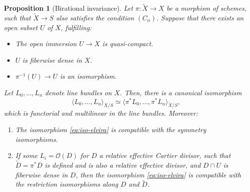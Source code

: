 \documentclass[JEP,XML,SOM,Unicode,published]{cedram}
\theoremstyle{plain}
\newtheorem{proposition}[theorem]{Proposition}
\theoremstyle{definition}
\newcommand{\Ocal}{\mathcal O}
\begin{document}
\begin{proposition}[Birational invariance]\label{prop:elvira}
Let $\pi \colon \widetilde{X} \to X$ be a morphism of schemes, such that $\widetilde{X} \to S$ also satisfies the condition $(C_n)$. Suppose that there exists an open subset $U$ of $X$, fulfilling:
\begin{itemize}
\item The open immersion $U \to X$ is quasi-compact.
\item $U$ is fiberwise dense in $X$.
\item $\pi^{-1}(U)\to U$ is an isomorphism.
\end{itemize}
Let $L_{0},\ldots, L_{n}$ denote line bundles on $X$. Then, there is a canonical isomorphism
\begin{equation}\label{eq:iso-elvira}
\langle L_0, \ldots, L_n \rangle_{X/S} \simeq \langle \pi^\ast L_0, \ldots, \pi^\ast L_n \rangle_{\widetilde{X}/S},
\end{equation}
which is functorial and multilinear in the line bundles. Moreover:
\begin{enumerate}
\item\label{item:elvira-1} The isomorphism \eqref{eq:iso-elvira} is compatible with the symmetry isomorphisms.
\item\label{item:elvira-3} If some $L_{i}=\Ocal(D)$ for $D$ a relative effective Cartier divisor, such that $\widetilde{D} = \pi^{\ast} D$ is defined and is also a relative effective divisor, and $D\cap U$ is fiberwise dense in $D$, then the isomorphism \eqref{eq:iso-elvira} is compatible with the restriction isomorphisms along $D$ and $\widetilde{D}$.
\end{enumerate}

\end{proposition}
\end{document}
